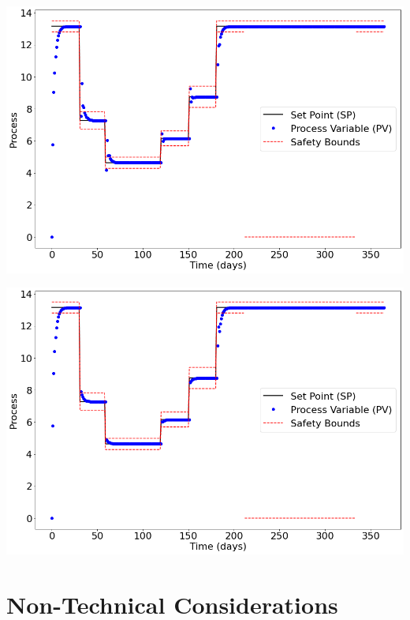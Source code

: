 \documentclass{article}
\begin{document}
\begin{multicols*}{2}
        \vspace{5mm}
        \noindent
        \begin{minipage}{0.49\textwidth}
            \includegraphics[width=\textwidth]{projectPID_untuned.png}
        \end{minipage}

        \noindent
        \begin{minipage}{0.49\textwidth}
            \includegraphics[width=\textwidth]{projectPID_tuned.png}
            \label{tunedCon}
        \end{minipage}

        \section{Non-Technical Considerations}


\end{multicols*}
\end{document}
